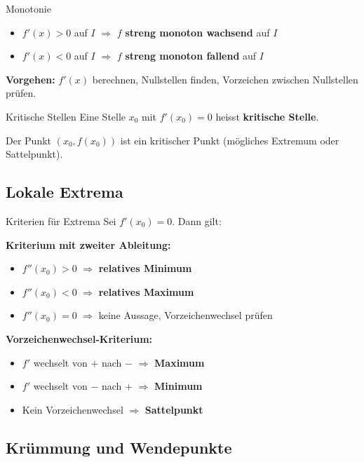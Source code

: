 \documentclass[a4paper,fontsize = 7pt]{scrartcl}
\begin{document}
\begin{mainbox}{Monotonie}
	\begin{itemize}
		\item $f'(x) > 0$ auf $I$ $\Rightarrow$ $f$ \textbf{streng monoton wachsend} auf $I$
		\item $f'(x) < 0$ auf $I$ $\Rightarrow$ $f$ \textbf{streng monoton fallend} auf $I$
	\end{itemize}

	\textbf{Vorgehen:} $f'(x)$ berechnen, Nullstellen finden, Vorzeichen zwischen Nullstellen prüfen.
\end{mainbox}

\begin{mainbox}{Kritische Stellen}
	Eine Stelle $x_0$ mit $f'(x_0) = 0$ heisst \textbf{kritische Stelle}.

	Der Punkt $(x_0, f(x_0))$ ist ein kritischer Punkt (mögliches Extremum oder Sattelpunkt).
\end{mainbox}

\subsection{Lokale Extrema}

\begin{mainbox}{Kriterien für Extrema}
	Sei $f'(x_0) = 0$. Dann gilt:

	\textbf{Kriterium mit zweiter Ableitung:}
	\begin{itemize}
		\item $f''(x_0) > 0$ $\Rightarrow$ \textbf{relatives Minimum}
		\item $f''(x_0) < 0$ $\Rightarrow$ \textbf{relatives Maximum}
		\item $f''(x_0) = 0$ $\Rightarrow$ keine Aussage, Vorzeichenwechsel prüfen
	\end{itemize}

	\textbf{Vorzeichenwechsel-Kriterium:}
	\begin{itemize}
		\item $f'$ wechselt von $+$ nach $-$ $\Rightarrow$ \textbf{Maximum}
		\item $f'$ wechselt von $-$ nach $+$ $\Rightarrow$ \textbf{Minimum}
		\item Kein Vorzeichenwechsel $\Rightarrow$ \textbf{Sattelpunkt}
	\end{itemize}
\end{mainbox}

\subsection{Krümmung und Wendepunkte}
\end{document}
